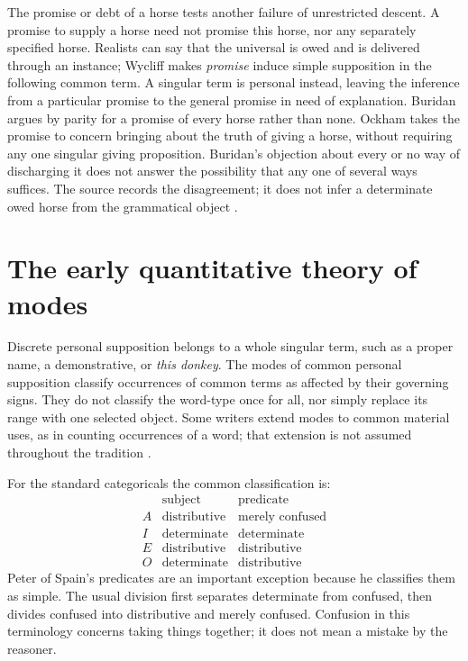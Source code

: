 The promise or debt of a horse tests another failure of unrestricted
descent. A promise to supply a horse need not promise this horse, nor
any separately specified horse. Realists can say that the universal is
owed and is delivered through an instance; Wycliff makes \emph{promise}
induce simple supposition in the following common term. A singular term
is personal instead, leaving the inference from a particular promise
to the general promise in need of explanation. Buridan argues by parity
for a promise of every horse rather than none. Ockham takes the promise
to concern bringing about the truth of giving a horse, without requiring
any one singular giving proposition. Buridan's objection about every
or no way of discharging it does not answer the possibility that any
one of several ways suffices. The source records the disagreement; it
does not infer a determinate owed horse from the grammatical object
\cite[pp.~220--221]{Parsons2007FordhamSupposition}.

\section{The early quantitative theory of modes}
\label{sec:p13-supposition-early-modes}

Discrete personal supposition belongs to a whole singular term, such
as a proper name, a demonstrative, or \emph{this donkey}. The modes of
common personal supposition classify occurrences of common terms as
affected by their governing signs. They do not classify the word-type
once for all, nor simply replace its range with one selected object.
Some writers extend modes to common material uses, as in counting
occurrences of a word; that extension is not assumed throughout the
tradition \cite[pp.~222--225]{Parsons2007FordhamSupposition}.

For the standard categoricals the common classification is:
\[
\begin{array}{c|cc}
 &\text{subject}&\text{predicate}\\\hline
A&\text{distributive}&\text{merely confused}\\
I&\text{determinate}&\text{determinate}\\
E&\text{distributive}&\text{distributive}\\
O&\text{determinate}&\text{distributive}
\end{array}
\]
Peter of Spain's predicates are an important exception because he
classifies them as simple. The usual division first separates
determinate from confused, then divides confused into distributive and
merely confused. Confusion in this terminology concerns taking things
together; it does not mean a mistake by the reasoner.


